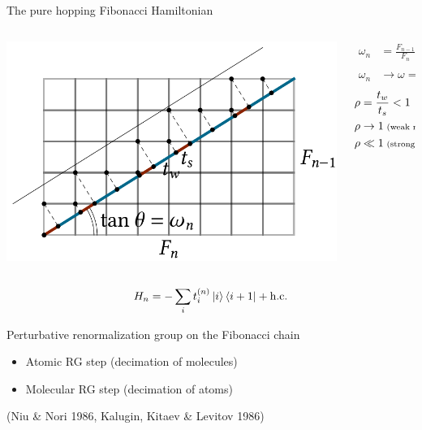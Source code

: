 \documentclass[xcolor=x11names,compress,professionalfonts]{beamer}
\renewcommand{\(}{\begin{columns}}
\renewcommand{\)}{\end{columns}}
\newcommand{\<}[1]{\begin{column}{#1}}
\renewcommand{\>}{\end{column}}
\newcommand{\zb}{\ensuremath{\overline{z}}}
\newcommand{\ham}{\ensuremath{H}}
\begin{document}
\begin{frame}{The pure hopping Fibonacci Hamiltonian}
\begin{columns}
\begin{column}{8.5cm}
	\centering
	\includegraphics[scale=.65]{cut_and_project.pdf}
\end{column}

\begin{column}{3cm}
\begin{align*}
\omega_n &= \frac{F_{n-1}}{F_{n}} \\
\omega_n &\rightarrow \omega = \frac{\sqrt{5}-1}{2}
\end{align*}
\begin{align*}
\rho &= \frac{t_w}{t_s} < 1 \\
\rho &\rightarrow 1 \scriptsize{\text{ (weak modulation)}} \\
\rho &\ll 1 \scriptsize{\text{ (strong modulation)}}
\end{align*}
\end{column}
\end{columns}

	\[ \ham_n = - \sum_i t_i^{(n)} \ket{i} \bra{i+1} + \text{h.c.} \]
\end{frame}

\begin{frame}{Perturbative renormalization group on the Fibonacci chain}
	\centering
	\begin{itemize}
	\item Atomic RG step (decimation of molecules) 
	\item Molecular RG step (decimation of atoms) 
	\end{itemize}
	\begin{flushright}
	\onslide<2>{$z= \rho/2$, $\zb = \rho^2$} (Niu \& Nori 1986, Kalugin, Kitaev \& Levitov 1986)
	\end{flushright}
\end{frame}
\end{document}
